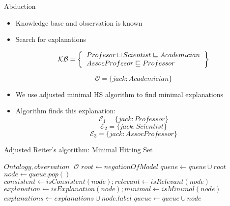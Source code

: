 \documentclass{beamer}
\begin{document}
\begin{frame}{Abduction}
	\begin{itemize}
		
		\item {
			Knowledge base and observation is known
		}
		
		\item {
			Search for explanations
		}
		
		\[ 
		\mathcal{KB} = \left\{
		\begin{tabular}{l c}
		$Profesor \sqcup Scientist \sqsubseteq Academician$ \\
		$AssocProfesor \sqsubseteq Professor$ \\
		\end{tabular}
		\right \}
		\]
		
		\[ \mathcal{O} = \{ jack: Academician \} \]
		
		\item {
			We use adjusted minimal HS algorithm to find minimal explanations
		}
		
		\item {
			Algorithm finds this explanation: 
			\[ \mathcal{E}_{1} = \{ jack: Professor \} \]
			\[ \mathcal{E}_{2} = \{ jack: Scientist \} \]
			\[ \mathcal{E}_{3} = \{ jack: AssocProfessor \} \]
		}
	\end{itemize}
\end{frame}

\begin{frame}{Adjusted Reiter's algorithm: Minimal Hitting Set}
\begin{algorithm}[H]
	\caption{Adjusted Minimal Hitting Set algorithm}
	\begin{algorithmic} 
		\REQUIRE $Ontology, observation \text{ } \mathcal{O}$
		\STATE $root \leftarrow negationOfModel$
		\STATE $queue \leftarrow queue \cup root$
		\STATE $node \leftarrow queue.pop()$
			\STATE $consistent \leftarrow isConsistent(node); relevant \leftarrow isRelevant(node)$
			\STATE $explanation \leftarrow isExplanation(node); minimal \leftarrow isMinimal(node)$ 
				\STATE $explanations \leftarrow explanations \cup node.label$
			\ELSE
				\STATE $queue \leftarrow queue \cup node$
			\ENDIF
			
			\ENDFOR
		\ENDWHILE		
	\end{algorithmic}
\end{algorithm}	
\end{frame}
\end{document}
